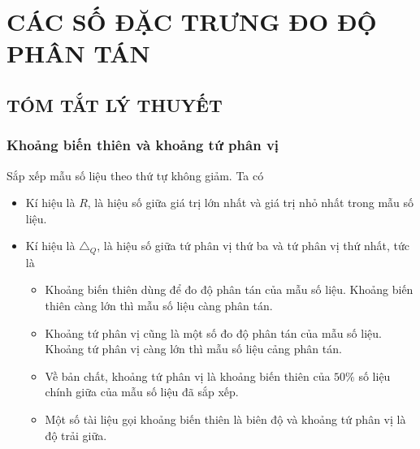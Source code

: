 \section{CÁC SỐ ĐẶC TRƯNG ĐO ĐỘ PHÂN TÁN}
\subsection{TÓM TẮT LÝ THUYẾT}
\subsubsection{Khoảng biến thiên và khoảng tứ phân vị}
Sắp xếp mẫu số liệu theo thứ tự không giảm. Ta có
\begin{itemize}
	\item [\iconMT]  Kí hiệu là $R$, là hiệu số giữa giá trị lớn nhất và giá trị nhỏ nhất trong
	mẫu số liệu.
	\item [\iconMT]  Kí hiệu là $ \triangle_Q $, là hiệu số giữa tứ phân vị thứ ba và tứ phân vị thứ nhất, tức là
	\begin{tcolorbox}[colframe=orange,colback=white,boxrule=0.2mm]
		\begin{itemize}
			\item  Khoảng biến thiên dùng để đo độ phân tán của mẫu số liệu. Khoảng biến thiên càng lớn thì mẫu số liệu càng phân tán.
			\item Khoảng tứ phân vị cũng là một số đo độ phân tán của mẫu số liệu. Khoảng tứ phân vị càng lớn thì mẫu số liệu cảng phân tán.
			\item Về bản chất, khoảng tứ phân vị là khoảng biến thiên của $50 \%$ số liệu chính giữa của mẫu số liệu đã sắp xếp.
			\item Một số tài liệu gọi khoảng biến thiên là biên độ và khoảng tứ phân vị là độ trải giữa.
		\end{itemize}
	\end{tcolorbox}
\end{itemize}
